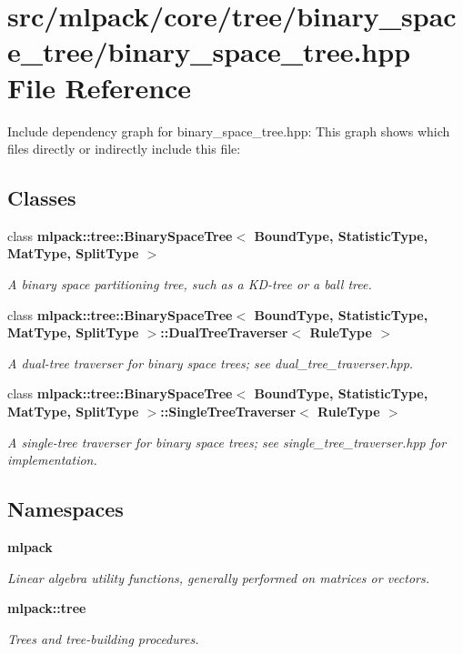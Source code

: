 \section{src/mlpack/core/tree/binary\-\_\-space\-\_\-tree/binary\-\_\-space\-\_\-tree.hpp File Reference}
\label{binary__space__tree_2binary__space__tree_8hpp}
Include dependency graph for binary\-\_\-space\-\_\-tree.\-hpp\-:
This graph shows which files directly or indirectly include this file\-:
\subsection*{Classes}
\begin{DoxyCompactItemize}
\item 
class {\bf mlpack\-::tree\-::\-Binary\-Space\-Tree$<$ Bound\-Type, Statistic\-Type, Mat\-Type, Split\-Type $>$}
\begin{DoxyCompactList}\small\item\em A binary space partitioning tree, such as a K\-D-\/tree or a ball tree. \end{DoxyCompactList}\item 
class {\bf mlpack\-::tree\-::\-Binary\-Space\-Tree$<$ Bound\-Type, Statistic\-Type, Mat\-Type, Split\-Type $>$\-::\-Dual\-Tree\-Traverser$<$ Rule\-Type $>$}
\begin{DoxyCompactList}\small\item\em A dual-\/tree traverser for binary space trees; see dual\-\_\-tree\-\_\-traverser.\-hpp. \end{DoxyCompactList}\item 
class {\bf mlpack\-::tree\-::\-Binary\-Space\-Tree$<$ Bound\-Type, Statistic\-Type, Mat\-Type, Split\-Type $>$\-::\-Single\-Tree\-Traverser$<$ Rule\-Type $>$}
\begin{DoxyCompactList}\small\item\em A single-\/tree traverser for binary space trees; see single\-\_\-tree\-\_\-traverser.\-hpp for implementation. \end{DoxyCompactList}\end{DoxyCompactItemize}
\subsection*{Namespaces}
\begin{DoxyCompactItemize}
\item 
{\bf mlpack}
\begin{DoxyCompactList}\small\item\em Linear algebra utility functions, generally performed on matrices or vectors. \end{DoxyCompactList}\item 
{\bf mlpack\-::tree}
\begin{DoxyCompactList}\small\item\em Trees and tree-\/building procedures. \end{DoxyCompactList}\end{DoxyCompactItemize}
